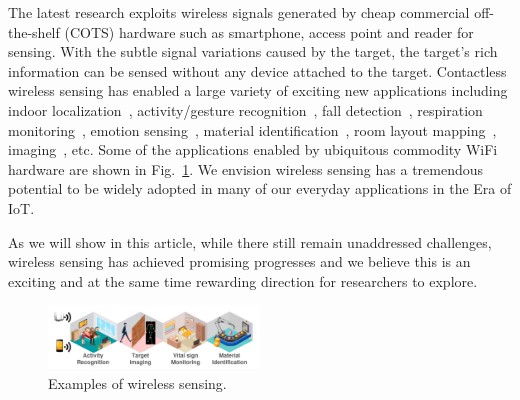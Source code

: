 The latest research exploits wireless signals generated by cheap commercial off-the-shelf (COTS) hardware such as smartphone, \WiFi access point and \RFID reader for sensing. %
With the subtle signal variations caused by the target, the target's rich information can be sensed without any device attached to the target.  Contactless wireless sensing has enabled a large variety of exciting new applications including indoor localization~\cite{Arraytrack,
Tagoram}, activity/gesture recognition~\cite{Wang2015Understanding, wang2016human}, fall detection~\cite{wang2017wifall}, respiration monitoring~\cite{Smart-homes}, emotion sensing~\cite{Zhao2017Emotion},  material identification~\cite{Tagscan, LiquID}, room layout mapping~\cite{Lu2018}, imaging~\cite{zhao2018rf}, etc. Some of the applications enabled by ubiquitous commodity WiFi hardware are shown in  Fig.~\ref{fig:scenarios}. %
We envision wireless sensing has a tremendous potential to be widely adopted in many of our everyday applications in the Era of IoT.




As we will show in this article, while there still remain unaddressed challenges, wireless sensing has achieved promising progresses and we believe this is an exciting and at the same time rewarding direction for researchers to explore.



\begin{figure} [t!]
\centering
\includegraphics[width=0.5\textwidth]{figures/scenarios.pdf}
\caption{Examples of wireless sensing.}
\label{fig:scenarios}
\end{figure}


